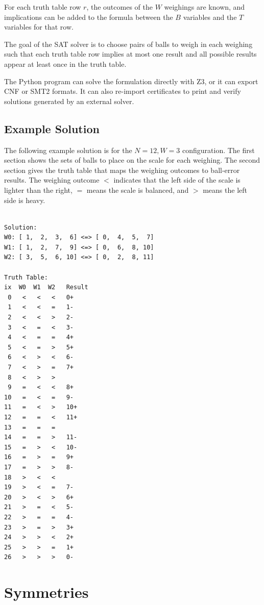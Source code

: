 \documentclass[conference]{IEEEtran}
\begin{document}
For each truth table row $r$, the outcomes of the $W$ weighings are known, and implications can be added to the formula
between the $B$ variables and the $T$ variables for that row.

The goal of the SAT solver is to choose pairs of balls to weigh in each weighing such that each truth table row implies
at most one result and all possible results appear at least once in the truth table.

The Python program can solve the formulation directly with Z3, or it can export CNF or SMT2 formats.
It can also re-import certificates to print and verify solutions generated by an external solver.

\subsection{Example Solution}

The following example solution is for the $N=12, W=3$ configuration.
The first section shows the sets of balls to place on the scale for each weighing.
The second section gives the truth table that maps the weighing outcomes to ball-error results.
The weighing outcome $<$ indicates that the left side of the scale is lighter than the right,
$=$ means the scale is balanced, and $>$ means the left side is heavy.

\begin{small}
\begin{BVerbatim}

Solution:
W0: [ 1,  2,  3,  6] <=> [ 0,  4,  5,  7]
W1: [ 1,  2,  7,  9] <=> [ 0,  6,  8, 10]
W2: [ 3,  5,  6, 10] <=> [ 0,  2,  8, 11]

Truth Table:
ix  W0  W1  W2   Result
 0   <   <   <   0+
 1   <   <   =   1-
 2   <   <   >   2-
 3   <   =   <   3-
 4   <   =   =   4+
 5   <   =   >   5+
 6   <   >   <   6-
 7   <   >   =   7+
 8   <   >   >
 9   =   <   <   8+
10   =   <   =   9-
11   =   <   >   10+
12   =   =   <   11+
13   =   =   =
14   =   =   >   11-
15   =   >   <   10-
16   =   >   =   9+
17   =   >   >   8-
18   >   <   <
19   >   <   =   7-
20   >   <   >   6+
21   >   =   <   5-
22   >   =   =   4-
23   >   =   >   3+
24   >   >   <   2+
25   >   >   =   1+
26   >   >   >   0-
\end{BVerbatim}
\end{small}

\section{Symmetries}
\end{document}

